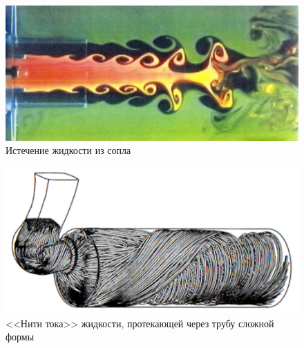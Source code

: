 \begin{figure}[htp]
\centering
\includegraphics[width = 0.7\linewidth]{historyImg/jet_small.pdf}
\caption{Истечение жидкости из сопла}
\label{}
\end{figure}

\begin{figure}[htp]
\centering
\includegraphics[width=0.7\linewidth]{historyImg/flow_small.pdf}
\caption{<<Нити тока>> жидкости, протекающей через трубу сложной формы}
\label{}
\end{figure}